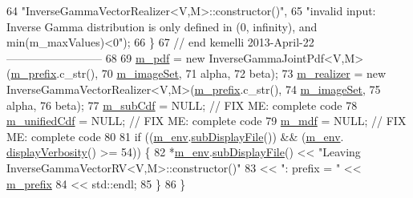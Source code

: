 \begin{DoxyCode}
64                       \textcolor{stringliteral}{"InverseGammaVectorRealizer<V,M>::constructor()"},
65                       \textcolor{stringliteral}{"invalid input: Inverse Gamma distribution is only defined in (0, infinity), and
       min(m\_maxValues)<0"});      
66  \}      
67 \textcolor{comment}{// end kemelli 2013-April-22 --------------------------}
68   
69   \hyperlink{class_q_u_e_s_o_1_1_base_vector_r_v_a0ca926bca6fbcc688be6fc7496449e8e}{m\_pdf}        = \textcolor{keyword}{new} InverseGammaJointPdf<V,M>(\hyperlink{class_q_u_e_s_o_1_1_base_vector_r_v_a030ce3bc9873a9eaf6d8bf452c096ab3}{m\_prefix}.c\_str(),
70                                                       \hyperlink{class_q_u_e_s_o_1_1_base_vector_r_v_ad31872bb4da22d47528cb9d691b3b7ff}{m\_imageSet},
71                                                       alpha,
72                                                       beta);
73   \hyperlink{class_q_u_e_s_o_1_1_base_vector_r_v_ad99bc05293c0fd0a0accb3191fb7119e}{m\_realizer}   = \textcolor{keyword}{new} InverseGammaVectorRealizer<V,M>(\hyperlink{class_q_u_e_s_o_1_1_base_vector_r_v_a030ce3bc9873a9eaf6d8bf452c096ab3}{m\_prefix}.c\_str(),
74                                                             \hyperlink{class_q_u_e_s_o_1_1_base_vector_r_v_ad31872bb4da22d47528cb9d691b3b7ff}{m\_imageSet},
75                                                             alpha,
76                                                             beta);
77   \hyperlink{class_q_u_e_s_o_1_1_base_vector_r_v_a1a1117671c7fa2e572a9484463bee3a5}{m\_subCdf}     = NULL; \textcolor{comment}{// FIX ME: complete code}
78   \hyperlink{class_q_u_e_s_o_1_1_base_vector_r_v_a31a1d44bbb6a7c030ca31a9577904252}{m\_unifiedCdf} = NULL; \textcolor{comment}{// FIX ME: complete code}
79   \hyperlink{class_q_u_e_s_o_1_1_base_vector_r_v_a5a95d0107f66cf9b0ed3ad18a3d738df}{m\_mdf}        = NULL; \textcolor{comment}{// FIX ME: complete code}
80 
81   \textcolor{keywordflow}{if} ((\hyperlink{class_q_u_e_s_o_1_1_base_vector_r_v_a556761c50e2d171977ef5f19a63c8c73}{m\_env}.\hyperlink{class_q_u_e_s_o_1_1_base_environment_a8a0064746ae8dddfece4229b9ad374d6}{subDisplayFile}()) && (\hyperlink{class_q_u_e_s_o_1_1_base_vector_r_v_a556761c50e2d171977ef5f19a63c8c73}{m\_env}.
      \hyperlink{class_q_u_e_s_o_1_1_base_environment_a1fe5f244fc0316a0ab3e37463f108b96}{displayVerbosity}() >= 54)) \{
82     *\hyperlink{class_q_u_e_s_o_1_1_base_vector_r_v_a556761c50e2d171977ef5f19a63c8c73}{m\_env}.\hyperlink{class_q_u_e_s_o_1_1_base_environment_a8a0064746ae8dddfece4229b9ad374d6}{subDisplayFile}() << \textcolor{stringliteral}{"Leaving InverseGammaVectorRV<V,M>::constructor()"}
83                             << \textcolor{stringliteral}{": prefix = "} << \hyperlink{class_q_u_e_s_o_1_1_base_vector_r_v_a030ce3bc9873a9eaf6d8bf452c096ab3}{m\_prefix}
84                             << std::endl;
85   \}
86 \}
\end{DoxyCode}
